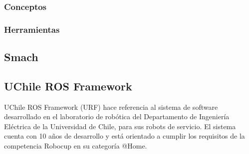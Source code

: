 


\subsubsection{Conceptos}

\subsubsection{Herramientas}


\subsection{Smach}

\subsection{UChile ROS Framework}

UChile ROS Framework (URF) hace referencia al sistema de software desarrollado en el laboratorio de robótica del Departamento de Ingeniería Eléctrica de la Universidad de Chile, para sus robots de servicio. El sistema cuenta con 10 años de desarrollo y está orientado a cumplir los requisitos de la competencia Robocup en su categoría @Home.

